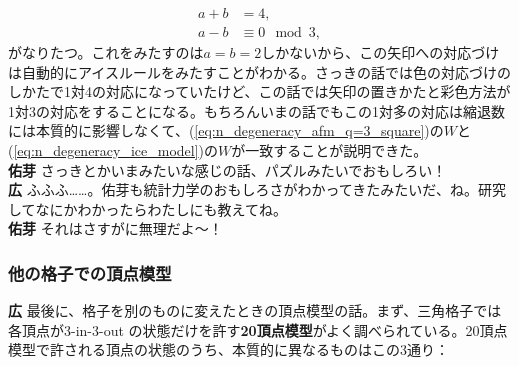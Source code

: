 \documentclass[paper=b5j,fontsize=12Q,jafontsize=12Q,baselineskip=21Q]{jlreq}
\DeclareRobustCommand{\hiron}{\textbf{広 }}
\DeclareRobustCommand{\umen}{\textbf{佑芽 }}
\begin{document}
\begin{refsection}
\begin{align}
  a+b &= 4,\\
  a-b &\equiv 0 \mod 3,
\end{align}
がなりたつ。これをみたすのは$a=b=2$しかないから、この矢印への対応づけは自動的にアイスルールをみたすことがわかる。さっきの話では色の対応づけのしかたで1対4の対応になっていたけど、この話では矢印の置きかたと彩色方法が1対3の対応をすることになる。もちろんいまの話でもこの1対多の対応は縮退数には本質的に影響しなくて、(\ref{eq:n_degeneracy_afm_q=3_square})の$W$と(\ref{eq:n_degeneracy_ice_model})の$W$が一致することが説明できた。
\\\umen さっきとかいまみたいな感じの話、パズルみたいでおもしろい！
\\\hiron ふふふ……。佑芽も統計力学のおもしろさがわかってきたみたいだ、ね。研究してなにかわかったらわたしにも教えてね。
\\\umen それはさすがに無理だよ〜！

\subsubsection{他の格子での頂点模型}
\hiron 最後に、格子を別のものに変えたときの頂点模型の話。まず、三角格子では各頂点が3-in-3-out の状態だけを許す\textbf{20頂点模型}がよく調べられている。20頂点模型で許される頂点の状態のうち、本質的に異なるものはこの3通り：

\begin{center}
\end{center}
\end{refsection}
\end{document}
